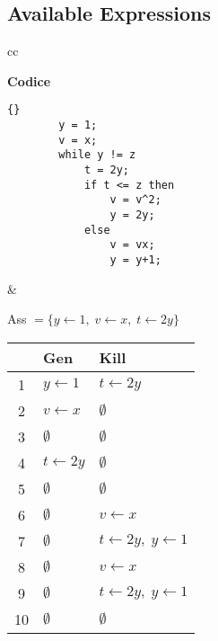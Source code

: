 \documentclass[a4paper,12pt,openany]{article}
\begin{document}
    \subsection*{Available Expressions}
    \begin{tabular}{cc}
    \begin{minipage}{0.5\textwidth}
    \textbf{Codice}
    \begin{lstlisting}{}
        y = 1;
        v = x;
        while y != z
            t = 2y;
            if t <= z then
                v = v^2;
                y = 2y;
            else
                v = vx;
                y = y+1;
    \end{lstlisting}
    \end{minipage}&
    
    \noindent
    \begin{minipage}{0.5\textwidth}
    Ass $= \{y\leftarrow1,\;v\leftarrow x,\;t\leftarrow2y\}$\\[0.5em]
    \begin{tabular}{c | l | l}
        & Gen & Kill\\
        \hline
        1  & $y\leftarrow1$ & $t\leftarrow2y$\\
        2  & $v\leftarrow x$ & $\emptyset$\\
        3  & $\emptyset$ & $\emptyset$\\
        4  & $t\leftarrow2y$ & $\emptyset$\\
        5  & $\emptyset$ & $\emptyset$\\
        6  & $\emptyset$ & $v\leftarrow x$\\
        7  & $\emptyset$ & $t\leftarrow2y,\; y\leftarrow1$\\
        8  & $\emptyset$ & $v\leftarrow x$\\
        9  & $\emptyset$ & $t\leftarrow2y,\; y\leftarrow1$\\
        10 & $\emptyset$ & $\emptyset$\\
    \end{tabular}
    \end{minipage}
    \end{tabular}
\end{document}
